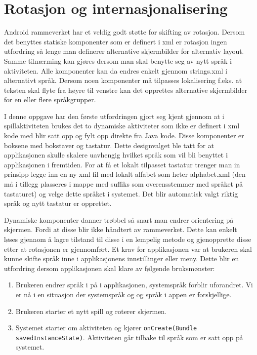 \section{Rotasjon og internasjonalisering}
Android rammeverket har et veldig godt støtte for skifting av rotasjon. Dersom det benyttes statiske komponenter som er definert i xml er rotasjon ingen utfordring så lenge man definerer alternative skjermbilder for alternativ layout. Samme tilnærming kan gjøres dersom man skal benytte seg av nytt språk i aktiviteten. Alle komponenter kan da endres enkelt gjennom strings.xml i alternativt språk. Dersom noen komponenter må tilpasses lokalisering f.eks. at teksten skal flyte fra høyre til venstre kan det opprettes alternative skjermbilder for en eller flere språkgrupper. 

I denne oppgave har den første utfordringen gjort seg kjent gjennom at i spillaktiviteten brukes det to dynamiske aktiviteter som ikke er definert i xml kode med blir satt opp og fylt opp direkte fra Java kode. Disse komponenter er boksene med bokstaver og tastatur. Dette designvalget ble tatt for at applikasjonen skulle skalere uavhengig hvilket språk som vil bli benyttet i applikasjonen i fremtiden. For at få et lokalt tilpasset tastatur trenger man in prinsipp legge inn en ny xml fil med lokalt alfabet som heter alphabet.xml (den må i tillegg plasseres i mappe med suffiks som overensstemmer med språket på tastaturet) og velge dette språket i systemet. Det blir automatisk valgt riktig språk og nytt tastatur er opprettet. 

Dynamiske komponenter danner trøbbel så snart man endrer orientering på skjermen. Fordi at disse blir ikke håndtert av rammeverket. Dette kan enkelt løses gjennom å lagre tilstand til disse i en lempelig metode og gjenopprette disse etter at rotasjonen er gjennomført. Et krav for applikasjonen var at brukeren skal kunne skifte språk inne i applikasjonens innstillinger eller meny. Dette blir en utfordring dersom applikasjonen skal klare av følgende bruksmønster:
\begin{enumerate}
\item Brukeren endrer språk i på i applikasjonen, systemspråk forblir uforandret. Vi er nå i en situasjon der systemspråk og og språk i appen er forskjellige. 
\item Brukeren starter et nytt spill og roterer skjermen. 
\item Systemet starter om aktiviteten og kjører \texttt{onCreate(Bundle savedInstanceState)}. Aktiviteten går tilbake til språk som er satt opp på systemet. 
\end{enumerate}

